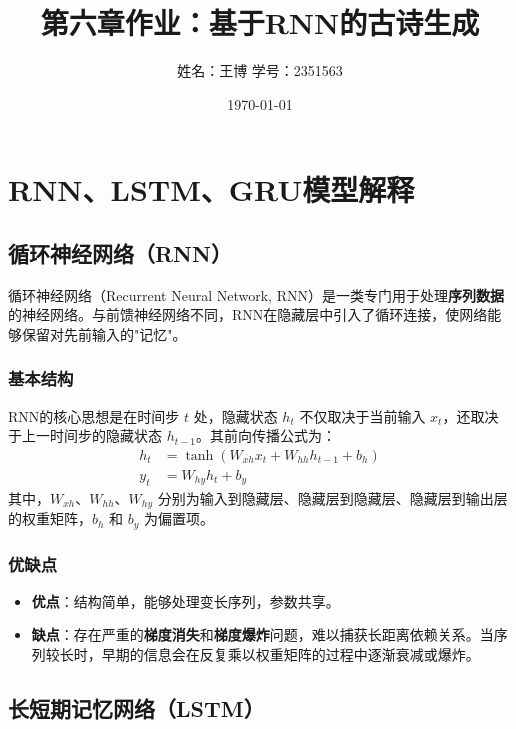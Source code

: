 \documentclass[12pt, a4paper]{ctexart}
\title{\textbf{第六章作业：基于RNN的古诗生成}}
\author{姓名：王博 \quad 学号：2351563}
\date{\today}
\begin{document}
\maketitle

\tableofcontents
\newpage

\section{RNN、LSTM、GRU模型解释}

\subsection{循环神经网络（RNN）}

循环神经网络（Recurrent Neural Network, RNN）是一类专门用于处理\textbf{序列数据}的神经网络。与前馈神经网络不同，RNN在隐藏层中引入了循环连接，使网络能够保留对先前输入的"记忆"。

\subsubsection{基本结构}

RNN的核心思想是在时间步 $t$ 处，隐藏状态 $h_t$ 不仅取决于当前输入 $x_t$，还取决于上一时间步的隐藏状态 $h_{t-1}$。其前向传播公式为：
\begin{align}
    h_t &= \tanh(W_{xh} x_t + W_{hh} h_{t-1} + b_h) \\
    y_t &= W_{hy} h_t + b_y
\end{align}
其中，$W_{xh}$、$W_{hh}$、$W_{hy}$ 分别为输入到隐藏层、隐藏层到隐藏层、隐藏层到输出层的权重矩阵，$b_h$ 和 $b_y$ 为偏置项。

\subsubsection{优缺点}
\begin{itemize}
    \item \textbf{优点}：结构简单，能够处理变长序列，参数共享。
    \item \textbf{缺点}：存在严重的\textbf{梯度消失}和\textbf{梯度爆炸}问题，难以捕获长距离依赖关系。当序列较长时，早期的信息会在反复乘以权重矩阵的过程中逐渐衰减或爆炸。
\end{itemize}

\subsection{长短期记忆网络（LSTM）}
\end{document}
